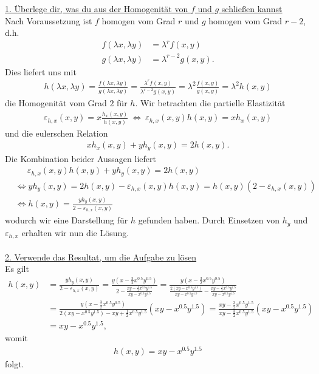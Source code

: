 \underline{1. Überlege dir, was du aus der Homogenität von $ f $ und $ g $ schließen kannst}\\
Nach Voraussetzung ist $ f $ homogen vom Grad $ r $ und $ g $ homogen vom Grad $ r-2 $, d.h.
\begin{align*}
f(\lambda x , \lambda y) &= \lambda^r f(x,y)\\
g(\lambda x , \lambda y) &= \lambda^{r-2} g(x,y).
\end{align*}
Dies liefert uns mit
\begin{align*}
h(\lambda x , \lambda y)
= 
\frac{f(\lambda x , \lambda y)}{g(\lambda x , \lambda y)}
=
\frac{\lambda^{r} f(x,y)}{\lambda^{r-2} g(x,y)}
=
\lambda^2 \frac{f(x,y)}{g(x,y)}
=
\lambda^2 h(x,y)
\end{align*}
die Homogenität vom Grad $ 2 $ für $ h $.
Wir betrachten die partielle Elastizität
\begin{align*}
\varepsilon_{h,x}(x,y) = x \frac{h_x(x,y)}{h(x,y)}
\
\Leftrightarrow
\
\varepsilon_{h,x}(x,y) h(x,y) = x h_x(x,y)
\end{align*}
und die eulerschen Relation
\begin{align*}
x h_x(x,y) + y h_y(x,y) = 2 h(x,y).
\end{align*}
Die Kombination beider Aussagen liefert
\begin{align*}
&\quad \ \ \varepsilon_{h,x}(x,y) h(x,y) + y h_y(x,y) = 2 h(x,y)\\
&\Leftrightarrow
y h_y(x,y) = 2 h(x,y)- \varepsilon_{h,x}(x,y) h(x,y) =
h(x,y) ( 2 - \varepsilon_{h,x}(x,y)) \\
&\Leftrightarrow
h(x,y) = \frac{y h_y(x,y)}{2 - \varepsilon_{h,x}(x,y)} 
\end{align*}
wodurch wir eine Darstellung für $ h $ gefunden haben.
Durch Einsetzen von $ h_y $ und $ \varepsilon_{h,x} $ erhalten wir nun die Lösung.
\\
\\
\underline{2. Verwende das Resultat, um die Aufgabe zu lösen}\\
Es gilt
\begin{align*}
h(x,y) &= \frac{y h_y(x,y)}{2 - \varepsilon_{h,x}(x,y)} 
=
\frac{y \left( x  - \frac{3}{2} x^{0.5} y^{0.5} \right)}{2 -  
	\frac{xy - \frac{1}{2}x^{0.5} y^{1.5}}{xy - x^{0.5} y^{1.5}}
	}
=
\frac{y \left( x  - \frac{3}{2} x^{0.5} y^{0.5} \right)}
{\frac{2 (xy - x^{0.5} y^{1.5})}{xy - x^{0.5} y^{1.5}} -  
	\frac{xy - \frac{1}{2}x^{0.5} y^{1.5}}{xy - x^{0.5} y^{1.5}}
}\\
&=
\frac{y \left( x  - \frac{3}{2} x^{0.5} y^{0.5} \right)}
{2 (xy - x^{0.5} y^{1.5}) -  
	xy + \frac{1}{2}x^{0.5} y^{1.5}
}
(xy - x^{0.5} y^{1.5})
=
\frac{  xy  - \frac{3}{2} x^{0.5} y^{1.5} }
{xy  -  
	 \frac{3}{2}x^{0.5} y^{1.5}
}
(xy - x^{0.5} y^{1.5})\\
&=
xy - x^{0.5} y^{1.5}, 
\end{align*}
womit 
\begin{align*}
h(x,y) = xy - x^{0.5} y^{1.5}
\end{align*}
folgt.